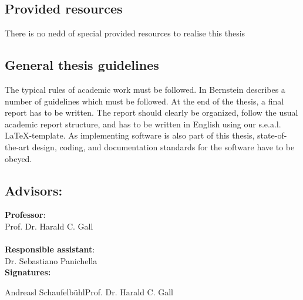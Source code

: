 \documentclass{task_description}
\begin{document}
\newpage

\subsection*{Provided resources}

There is no nedd of special provided resources to realise this thesis

\subsection*{General thesis guidelines}

The typical rules of academic work must be followed. In
\cite{Bernstein:8} Bernstein describes a number of guidelines which
must be followed. At the end of the thesis, a final report has to be
written. The report should clearly be organized, follow the usual academic
report structure, and has to be written in English using our
s.e.a.l. \LaTeX-template. As implementing software is also part of this thesis, state-of-the-art
design, coding, and documentation standards for the software have to be obeyed.

\subsection*{Advisors:}

\noindent\textbf{Professor}: \\
\noindent Prof. Dr. Harald C. Gall \\
\\
\noindent\textbf{Responsible assistant}: \\
\noindent Dr. Sebastiano Panichella \\

\vspace{2em}
\noindent\textbf{Signatures:}

\vspace{3\baselineskip}
\noindent Andreasl Schaufelb\"uhl\hfill Prof. Dr. Harald C. Gall
\clearpage


\end{document}
